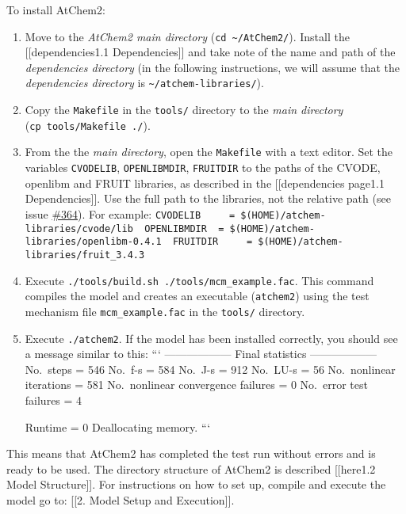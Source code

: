 To install AtChem2:

\begin{enumerate}
\def\labelenumi{\arabic{enumi}.}
\item
  Move to the \emph{AtChem2 main directory}
  (\texttt{cd\ \textasciitilde{}/AtChem2/}). Install the
  {[}{[}dependencies\textbar{}1.1 Dependencies{]}{]} and take note of
  the name and path of the \emph{dependencies directory} (in the
  following instructions, we will assume that the \emph{dependencies
  directory} is \texttt{\textasciitilde{}/atchem-libraries/}).
\item
  Copy the \texttt{Makefile} in the \texttt{tools/} directory to the
  \emph{main directory} (\texttt{cp\ tools/Makefile\ ./}).
\item
  From the the \emph{main directory}, open the \texttt{Makefile} with a
  text editor. Set the variables \texttt{CVODELIB},
  \texttt{OPENLIBMDIR}, \texttt{FRUITDIR} to the paths of the CVODE,
  openlibm and FRUIT libraries, as described in the {[}{[}dependencies
  page\textbar{}1.1 Dependencies{]}{]}. Use the full path to the
  libraries, not the relative path (see issue
  \href{https://github.com/AtChem/AtChem2/issues/364}{\#364}). For
  example:
  \texttt{CVODELIB\ \ \ \ \ =\ \$(HOME)/atchem-libraries/cvode/lib\ \ OPENLIBMDIR\ \ =\ \$(HOME)/atchem-libraries/openlibm-0.4.1\ \ FRUITDIR\ \ \ \ \ =\ \$(HOME)/atchem-libraries/fruit\_3.4.3}
\item
  Execute \texttt{./tools/build.sh\ ./tools/mcm\_example.fac}. This
  command compiles the model and creates an executable
  (\texttt{atchem2}) using the test mechanism file
  \texttt{mcm\_example.fac} in the \texttt{tools/} directory.
\item
  Execute \texttt{./atchem2}. If the model has been installed correctly,
  you should see a message similar to this: ``` ------------------ Final
  statistics ------------------ No.~steps = 546 No.~f-s = 584 No.~J-s =
  912 No.~LU-s = 56 No.~nonlinear iterations = 581 No.~nonlinear
  convergence failures = 0 No.~error test failures = 4

  Runtime = 0 Deallocating memory. ```
\end{enumerate}

This means that AtChem2 has completed the test run without errors and is
ready to be used. The directory structure of AtChem2 is described
{[}{[}here\textbar{}1.2 Model Structure{]}{]}. For instructions on how
to set up, compile and execute the model go to: {[}{[}2. Model Setup and
Execution{]}{]}.

